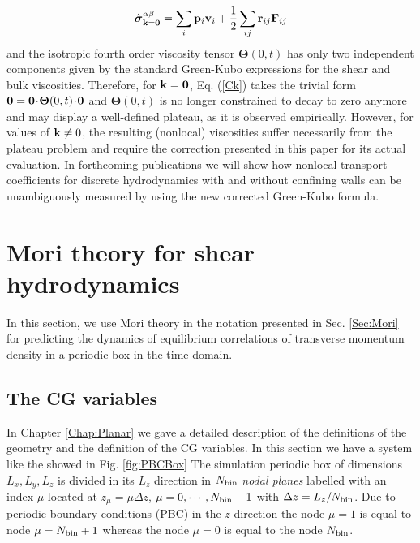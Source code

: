 \documentclass[b5paper,openright,11pt]{book}
\newcommand{\esc}{\!\cdot\!}
\begin{document}
{\begin{align}
  \hat{\boldsymbol{\sigma}}^{\alpha\beta}_{{\bf k}={\bf 0}}=\sum_i{\bf p}_i{\bf v}_i+\frac{1}{2}\sum_{ij}{\bf r}_{ij}{\bf F}_{ ij}
\end{align}
and     the     isotropic     fourth    order     viscosity     tensor
$\boldsymbol{\Theta}(0,t)$ has  only two independent  components given
by  the  standard  Green-Kubo  expressions  for  the  shear  and  bulk
viscosities.  Therefore, for ${\bf  k}={\bf 0}$, Eq.  (\ref{Ck}) takes
the trivial form ${\bf 0}={\bf 0}\esc \boldsymbol{\Theta}(0,t)\esc{\bf
  0}$ and $\boldsymbol{\Theta}(0,t)$ is no longer constrained to decay
to  zero anymore  and may  display a  well-defined plateau,  as it  is
observed  empirically. However,  for values  of ${\bf  k}\neq 0$,  the
resulting (nonlocal) viscosities suffer  necessarily from the plateau
problem and  require the  correction presented in  this paper  for its
actual  evaluation.   In forthcoming  publications  we  will show  how
nonlocal transport  coefficients for discrete hydrodynamics  with and
without confining walls can be unambiguously measured by using the new
corrected Green-Kubo formula.
} %


\section{Mori theory for shear hydrodynamics}
\label{Sec:MoriPBC}
In this section, we use Mori theory in the notation presented in Sec. \ref{Sec:Mori} for predicting the dynamics of equilibrium correlations of transverse momentum density in a periodic box in the time domain. 
\subsection{The CG variables}
\label{Sec:CGVariablesPBC}
In Chapter \ref{Chap:Planar} we gave a detailed description of the definitions of the geometry and the definition of the CG variables. In this section we have a system like the showed in Fig. \ref{fig:PBCBox}
The simulation periodic box of  dimensions $L_x,L_y,L_z$ is divided in
its $L_z$  direction in  $N_{\rm bin}$ \textit{nodal  planes} labelled
with   an    index   $\mu$   located   at    $z_\mu=\mu   \Delta   z$,
$\mu=0,\cdots,N_{\rm bin}-1$ with $\Delta  z=L_z/N_{\rm bin}$.  Due to
periodic  boundary conditions  (PBC)  in the  $z$  direction the  node
$\mu=1$ is equal to node  $\mu=N_{\rm bin}+1$ whereas the node $\mu=0$
is equal to the node  $N_{\rm bin}$.  
\end{document}
